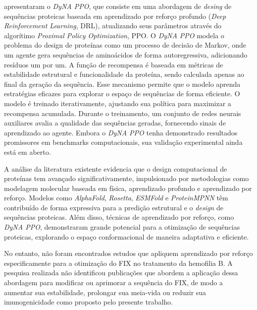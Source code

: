 \cite{DyNAPPO} apresentaram o \textit{DyNA PPO}, que consiste em uma
abordagem de \textit{desing} de sequências proteicas baseada em aprendizado por reforço profundo (\textit{Deep Reinforcement Learning}, DRL),
atualizando seus parâmetros através do algorítimo \textit{Proximal Policy Optimization}, PPO.  
O \textit{DyNA PPO} modela o problema do design de proteínas como um processo de decisão de Markov, 
onde um agente gera sequências de aminoácidos de forma autoregressiva, 
adicionando resíduos um por um. 
A função de recompensa é baseada em métricas de estabilidade estrutural e funcionalidade da proteína, 
sendo calculada apenas ao final da geração da sequência. 
Esse mecanismo permite que o modelo aprenda estratégias eficazes para explorar o espaço de sequências de forma eficiente.  
O modelo é treinado iterativamente, ajustando sua política para maximizar a recompensa acumulada.
Durante o treinamento, um conjunto de redes neurais auxiliares avalia a qualidade das sequências geradas,
fornecendo sinais de aprendizado ao agente. 
Embora o \textit{DyNA PPO} tenha demonstrado resultados promissores em benchmarks computacionais, 
sua validação experimental ainda está em aberto. 

A análise da literatura existente evidencia que o design computacional de proteínas tem avançado significativamente, 
impulsionado por metodologias como modelagem molecular baseada em física, aprendizado profundo e aprendizado por reforço. 
Modelos como \textit{AlphaFold}, \textit{Rosetta}, \textit{ESMFold} e \textit{ProteinMPNN} têm contribuído de forma expressiva
para a predição estrutural e o \textit{design} de sequências proteicas.
Além disso, técnicas de aprendizado por reforço, como \textit{DyNA PPO}, 
demonstraram grande potencial para a otimização de sequências proteicas, 
explorando o espaço conformacional de maneira adaptativa e eficiente.  

No entanto, não foram encontrados estudos que apliquem aprendizado 
por reforço especificamente para a otimização do FIX no tratamento da hemofilia B. 
A pesquisa realizada não identificou publicações que abordem a aplicação dessa abordagem para modificar ou aprimorar a sequência do FIX,
de modo a aumentar sua estabilidade, prolongar sua meia-vida ou reduzir sua imunogenicidade como proposto pelo presente trabalho. 
